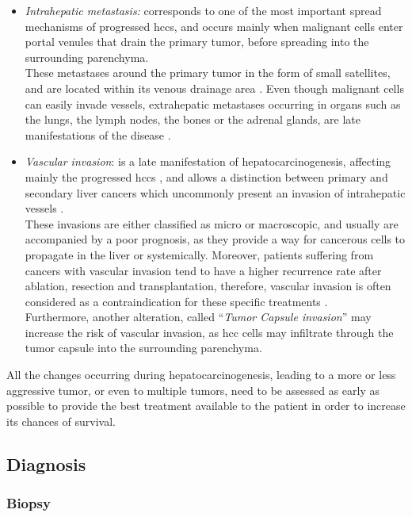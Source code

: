 \begin{itemize}
\item \emph{Intrahepatic metastasis:} corresponds to one of the most
  important spread mechanisms of progressed \ac{hcc}s, and occurs
  mainly when malignant cells enter portal venules that drain the
  primary tumor, before spreading into the surrounding parenchyma.\\
  These metastases around the primary tumor in the form of small
  satellites, and are located within its venous drainage area \cite{Nakashima2003}. Even though malignant cells can
  easily invade vessels, extrahepatic metastases occurring in organs
  such as the lungs, the lymph nodes, the bones or the adrenal glands,
  are late manifestations of the disease \cite{Theise2006, Trevisani2008a}.
\item \emph{Vascular invasion}: is a late manifestation of
  hepatocarcinogenesis, affecting mainly the progressed \ac{hcc}s
  \cite{EdmondsonHA1954}, and allows a distinction between
  primary and secondary liver cancers which uncommonly present an
  invasion of intrahepatic vessels \cite{Okuda1997}.\\
  These invasions are either classified as micro or macroscopic, and
  usually are accompanied by a poor prognosis, as they provide a way for
  cancerous cells to propagate in the liver or systemically. Moreover,
  patients suffering from cancers with vascular invasion tend to have a
  higher recurrence rate after ablation, resection and transplantation,
  therefore, vascular invasion is often considered as a contraindication
  for these specific treatments \cite{Llovet2004}.\\
  Furthermore, another alteration, called ``\emph{Tumor Capsule
  invasion}'' may increase the risk of vascular invasion, as \ac{hcc}
  cells may infiltrate through the tumor capsule into the surrounding
  parenchyma.
\end{itemize}

All the changes occurring during hepatocarcinogenesis, leading to a more
or less aggressive tumor, or even to multiple tumors, need to be
assessed as early as possible to provide the best treatment available to
the patient in order to increase its chances of survival.

\subsection{Diagnosis}\label{diagnosis}

\subsubsection{Biopsy}\label{biopsy}


